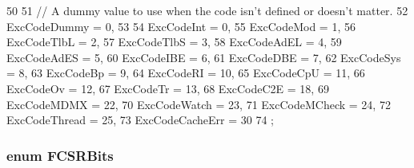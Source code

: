 \begin{DoxyCode}
50              {
51     // A dummy value to use when the code isn't defined or doesn't matter.
52     ExcCodeDummy = 0,
53 
54     ExcCodeInt = 0,
55     ExcCodeMod = 1,
56     ExcCodeTlbL = 2,
57     ExcCodeTlbS = 3,
58     ExcCodeAdEL = 4,
59     ExcCodeAdES = 5,
60     ExcCodeIBE = 6,
61     ExcCodeDBE = 7,
62     ExcCodeSys = 8,
63     ExcCodeBp = 9,
64     ExcCodeRI = 10,
65     ExcCodeCpU = 11,
66     ExcCodeOv = 12,
67     ExcCodeTr = 13,
68     ExcCodeC2E = 18,
69     ExcCodeMDMX = 22,
70     ExcCodeWatch = 23,
71     ExcCodeMCheck = 24,
72     ExcCodeThread = 25,
73     ExcCodeCacheErr = 30
74 };
\end{DoxyCode}
\hypertarget{namespaceMipsISA_a79915055f9ee1b5f815a7998dbc159f7}{
\subsubsection[{FCSRBits}]{\setlength{\rightskip}{0pt plus 5cm}enum {\bf FCSRBits}}}
\label{namespaceMipsISA_a79915055f9ee1b5f815a7998dbc159f7}
